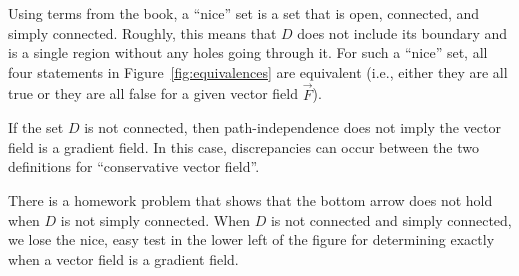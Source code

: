 Using terms from the book, a ``nice'' set is a set that is open,
connected, and simply connected.  Roughly, this means that $D$ does
not include its boundary and is a single region without any holes going
through it.  For such a ``nice'' set, all four statements in
Figure~\ref{fig:equivalences} are equivalent (i.e., either they are
all true or they are all false for a given vector field $\vec F$).

If the set $D$ is not connected, then path-independence does not imply
the vector field is a gradient field.  In this case, discrepancies can
occur between the two definitions for ``conservative vector field''.

There is a homework problem that shows that the bottom arrow
does not hold when $D$ is not simply connected.  When $D$ is not
connected and simply  connected, we lose the nice, easy test in the
lower left of the figure for determining exactly when a vector field
is a gradient field.












